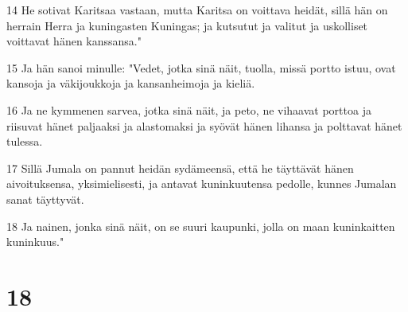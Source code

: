 \par 14 He sotivat Karitsaa vastaan, mutta Karitsa on voittava heidät, sillä hän on herrain Herra ja kuningasten Kuningas; ja kutsutut ja valitut ja uskolliset voittavat hänen kanssansa."
\par 15 Ja hän sanoi minulle: "Vedet, jotka sinä näit, tuolla, missä portto istuu, ovat kansoja ja väkijoukkoja ja kansanheimoja ja kieliä.
\par 16 Ja ne kymmenen sarvea, jotka sinä näit, ja peto, ne vihaavat porttoa ja riisuvat hänet paljaaksi ja alastomaksi ja syövät hänen lihansa ja polttavat hänet tulessa.
\par 17 Sillä Jumala on pannut heidän sydämeensä, että he täyttävät hänen aivoituksensa, yksimielisesti, ja antavat kuninkuutensa pedolle, kunnes Jumalan sanat täyttyvät.
\par 18 Ja nainen, jonka sinä näit, on se suuri kaupunki, jolla on maan kuninkaitten kuninkuus."

\chapter{18}

